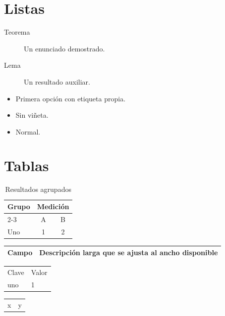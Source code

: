 \documentclass[11pt,a4paper]{article}
\begin{document}
\section{Listas}
\begin{description}
\item[Teorema] Un enunciado demostrado.
\item[Lema] Un resultado auxiliar.
\end{description}
\begin{itemize}
\item[a)] Primera opción con etiqueta propia.
\item[] Sin viñeta.
\item Normal.
\end{itemize}

\section{Tablas}
\begin{table}[htbp]
\centering
\caption{Resultados agrupados}\label{tab:grupos}
\begin{tabular}{|l|c|c|}
\hline
\multirow{2}{*}{Grupo} & \multicolumn{2}{c|}{Medición} \\ \cline{2-3}
 & A & B \\ \hline
Uno & 1 & 2 \\ \hline
\end{tabular}
\end{table}
\begin{tabularx}{\linewidth}{lX}
\toprule
Campo & Descripción larga que se ajusta al ancho disponible \\
\bottomrule
\end{tabularx}
\begin{longtable}{ll}
Clave & Valor \\
uno & 1 \\
\end{longtable}
\begin{table}[t]
\centering
\begin{tabular}{cc}
x & y \\
\end{tabular}
\end{table}
\end{document}
